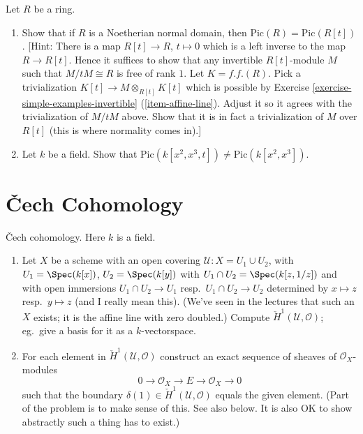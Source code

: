 \begin{exercise}
\label{exercise-traverso}
Let $R$ be a ring.
\begin{enumerate}
\item Show that if $R$ is a Noetherian normal domain, then
$\text{Pic}(R) = \text{Pic}(R[t])$. [Hint: There is a map
$R[t] \to R$, $t \mapsto 0$ which is a left inverse to the map
$R \to R[t]$. Hence it suffices to show that any invertible
$R[t]$-module $M$ such that $M/tM \cong R$ is free of rank $1$.
Let $K = f.f.(R)$.
Pick a trivialization $K[t] \to M \otimes_{R[t]} K[t]$ which is possible by
Exercise \ref{exercise-simple-examples-invertible} (\ref{item-affine-line}).
Adjust it so it agrees with the trivialization
of $M/tM$ above. Show that it is in fact a trivialization of
$M$ over $R[t]$ (this is where normality comes in).]
\item Let $k$ be a field. Show that
$\text{Pic}(k[x^2, x^3, t]) \not = \text{Pic}(k[x^2, x^3])$.
\end{enumerate}
\end{exercise}













\section{{\v C}ech Cohomology}
\label{section-cech-cohomology}

\begin{exercise}
\label{exercise-cech-cohomology}
{\v C}ech cohomology. Here $k$ is a field.
\begin{enumerate}
\item Let $X$ be a scheme with an open covering
${\mathcal U} : X = U_1 \cup U_2$, with $U_1 = \Spec(k[x])$,
$U_2 =  \Spec(k[y])$
with $U_1 \cap U_2 = \Spec(k[z, 1/z])$ and with open immersions
$U_1 \cap U_2 \to U_1$ resp.\ $U_1 \cap U_2 \to U_2$ determined
by $x \mapsto z$ resp.\ $y \mapsto z$ (and I really mean this).
(We've seen in the lectures that such an $X$ exists; it is the affine
line with zero doubled.) Compute ${\check H}^1({\mathcal U}, {\mathcal
O})$;
eg.\ give a basis for it as a $k$-vectorspace.
\item For each element in
${\check H}^1({\mathcal U}, {\mathcal O})$
construct an exact sequence of sheaves of ${\mathcal O}_X$-modules
$$
0 \to {\mathcal O}_X \to E \to {\mathcal O}_X \to 0
$$
such that the boundary $\delta(1) \in {\check H}^1({\mathcal U},
{\mathcal O})$
equals the given element. (Part of the problem is to make sense of this.
See also below.
It is also OK to show abstractly such a thing has to exist.)
\end{enumerate}
\end{exercise}

